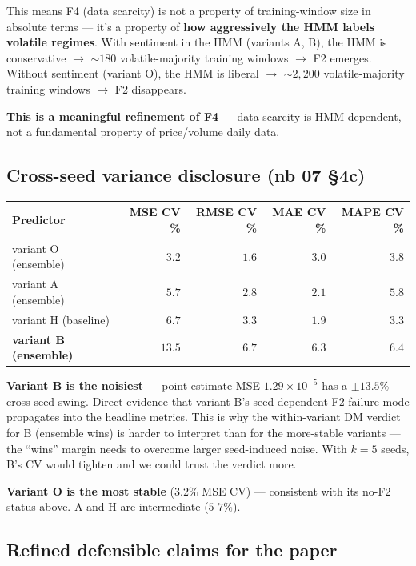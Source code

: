 \documentclass[11pt]{article}
\begin{document}
This means F4 (data scarcity) is not a property of training-window size in absolute terms --- it's a property of \textbf{how aggressively the HMM labels volatile regimes}. With sentiment in the HMM (variants A, B), the HMM is conservative $\to$ $\sim 180$ volatile-majority training windows $\to$ F2 emerges. Without sentiment (variant O), the HMM is liberal $\to$ $\sim 2{,}200$ volatile-majority training windows $\to$ F2 disappears.

\textbf{This is a meaningful refinement of F4} --- data scarcity is HMM-dependent, not a fundamental property of price/volume daily data.

\subsection*{Cross-seed variance disclosure (nb 07 \S 4c)}

\begin{center}
\renewcommand{\arraystretch}{1.15}
\begin{tabular}{@{}lrrrr@{}}
\toprule
Predictor & MSE CV \% & RMSE CV \% & MAE CV \% & MAPE CV \% \\
\midrule
variant O (ensemble)     & $3.2$  & $1.6$  & $3.0$  & $3.8$  \\
variant A (ensemble)     & $5.7$  & $2.8$  & $2.1$  & $5.8$  \\
variant H (baseline)     & $6.7$  & $3.3$  & $1.9$  & $3.3$  \\
\textbf{variant B (ensemble)} & $\mathbf{13.5}$ & $\mathbf{6.7}$ & $\mathbf{6.3}$ & $6.4$ \\
\bottomrule
\end{tabular}
\end{center}

\textbf{Variant B is the noisiest} --- point-estimate MSE $1.29 \times 10^{-5}$ has a $\pm 13.5\%$ cross-seed swing. Direct evidence that variant B's seed-dependent F2 failure mode propagates into the headline metrics. This is why the within-variant DM verdict for B (ensemble wins) is harder to interpret than for the more-stable variants --- the ``wins'' margin needs to overcome larger seed-induced noise. With $k = 5$ seeds, B's CV would tighten and we could trust the verdict more.

\textbf{Variant O is the most stable} ($3.2\%$ MSE CV) --- consistent with its no-F2 status above. A and H are intermediate ($5\text{-}7\%$).

\subsection*{Refined defensible claims for the paper}
\end{document}
